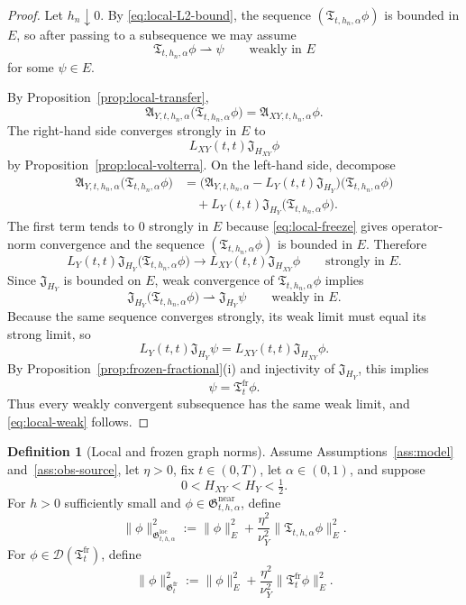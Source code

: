 \documentclass[11pt,a4paper]{amsart}
\theoremstyle{plain}
\theoremstyle{definition}
\newtheorem{definition}[theorem]{Definition}
\theoremstyle{remark}
\begin{document}
\begin{proof}
Let \(h_n\downarrow0\). By \eqref{eq:local-L2-bound}, the sequence
\((\mathfrak T_{t,h_n,\alpha}\phi)\) is bounded in \(E\), so after passing to a subsequence we
may assume
\[
\mathfrak T_{t,h_n,\alpha}\phi \rightharpoonup \psi
\qquad\text{weakly in }E
\]
for some \(\psi\in E\).

By Proposition~\ref{prop:local-transfer},
\[
\mathfrak A_{Y,t,h_n,\alpha}\bigl(\mathfrak T_{t,h_n,\alpha}\phi\bigr)
=
\mathfrak A_{XY,t,h_n,\alpha}\phi.
\]
The right-hand side converges strongly in \(E\) to
\[
L_{XY}(t,t)\mathfrak J_{H_{XY}}\phi
\]
by Proposition~\ref{prop:local-volterra}. On the left-hand side, decompose
\begin{align*}
\mathfrak A_{Y,t,h_n,\alpha}\bigl(\mathfrak T_{t,h_n,\alpha}\phi\bigr)
&=
\bigl(\mathfrak A_{Y,t,h_n,\alpha}-L_Y(t,t)\mathfrak J_{H_Y}\bigr)
\bigl(\mathfrak T_{t,h_n,\alpha}\phi\bigr) \\
&\quad+
L_Y(t,t)\mathfrak J_{H_Y}\bigl(\mathfrak T_{t,h_n,\alpha}\phi\bigr).
\end{align*}
The first term tends to \(0\) strongly in \(E\) because
\eqref{eq:local-freeze} gives operator-norm convergence and the sequence
\((\mathfrak T_{t,h_n,\alpha}\phi)\) is bounded in \(E\). Therefore
\[
L_Y(t,t)\mathfrak J_{H_Y}\bigl(\mathfrak T_{t,h_n,\alpha}\phi\bigr)
\longrightarrow
L_{XY}(t,t)\mathfrak J_{H_{XY}}\phi
\qquad\text{strongly in }E.
\]
Since \(\mathfrak J_{H_Y}\) is bounded on \(E\), weak convergence of
\(\mathfrak T_{t,h_n,\alpha}\phi\) implies
\[
\mathfrak J_{H_Y}\bigl(\mathfrak T_{t,h_n,\alpha}\phi\bigr)
\rightharpoonup
\mathfrak J_{H_Y}\psi
\qquad\text{weakly in }E.
\]
Because the same sequence converges strongly, its weak limit must equal its strong limit, so
\[
L_Y(t,t)\mathfrak J_{H_Y}\psi
=
L_{XY}(t,t)\mathfrak J_{H_{XY}}\phi.
\]
By Proposition~\ref{prop:frozen-fractional}(i) and injectivity of \(\mathfrak J_{H_Y}\), this
implies
\[
\psi=\mathfrak T_t^{\mathrm{fr}}\phi.
\]
Thus every weakly convergent subsequence has the same weak limit, and \eqref{eq:local-weak}
follows.
\end{proof}

\begin{definition}[Local and frozen graph norms]\label{def:local-graph-norm}
Assume Assumptions~\ref{ass:model} and~\ref{ass:obs-source}, let \(\eta>0\), fix \(t\in(0,T)\),
let \(\alpha\in(0,1)\), and suppose
\[
0<H_{XY}<H_Y<\tfrac12.
\]
For \(h>0\) sufficiently small and \(\phi\in\mathfrak G_{t,h,\alpha}^{\mathrm{near}}\), define
\begin{equation}\label{eq:local-graph-norm}
\|\phi\|_{\mathfrak G_{t,h,\alpha}^{\mathrm{loc}}}^2
:=
\|\phi\|_E^2
+\frac{\eta^2}{\nu_Y^2}\|\mathfrak T_{t,h,\alpha}\phi\|_E^2.
\end{equation}
For \(\phi\in\mathcal D(\mathfrak T_t^{\mathrm{fr}})\), define
\begin{equation}\label{eq:frozen-graph-norm}
\|\phi\|_{\mathfrak G_t^{\mathrm{fr}}}^2
:=
\|\phi\|_E^2
+\frac{\eta^2}{\nu_Y^2}\|\mathfrak T_t^{\mathrm{fr}}\phi\|_E^2.
\end{equation}
\end{definition}
\end{document}
